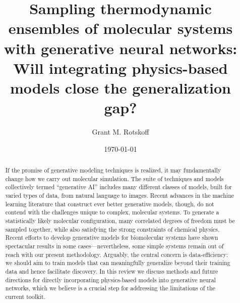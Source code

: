 \documentclass[11pt]{article}
\title{Sampling thermodynamic ensembles of molecular systems with generative neural networks: Will integrating physics-based models close the generalization gap?}
\author{Grant M. Rotskoff}
\date{\today}
\begin{document}
\maketitle

\begin{abstract}
If the promise of generative modeling techniques is realized, it may fundamentally change how we carry out molecular simulation.
The suite of techniques and models collectively termed ``generative AI'' includes many different classes of models, built for varied types of data, from natural language to images.
Recent advances in the machine learning literature that construct ever better generative models, though, do not contend with the challenges unique to complex, molecular systems. 
To generate a statistically likely molecular configuration, many correlated degrees of freedom must be sampled together, while also satisfying the strong constraints of chemical physics. 
Recent efforts to develop generative models for biomolecular systems have shown spectacular results in some cases---nevertheless, some simple systems remain out of reach with our present methodology.
Arguably, the central concern is data-efficiency: we should aim to train models that can meaningfully generalize beyond their training data and hence facilitate discovery.
In this review we discuss methods and future directions for directly incorporating physics-based models into generative neural networks, which we believe is a crucial step for addressing the limitations of the current toolkit.
\end{abstract}




\end{document}

